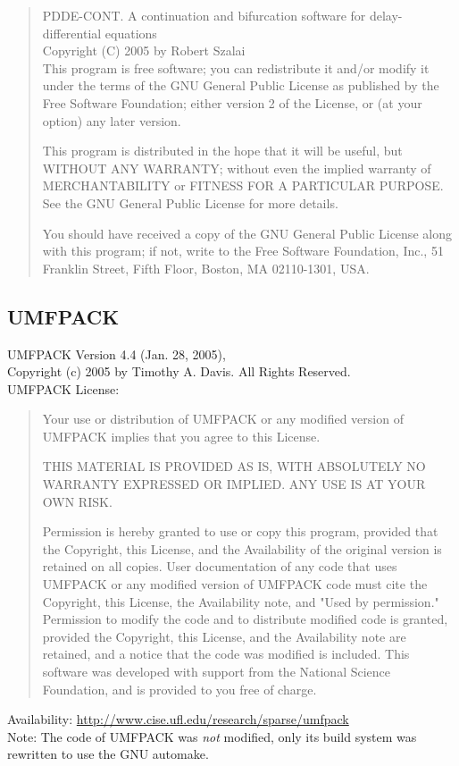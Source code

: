 \documentclass[10pt,a4paper]{ddedoc}
\begin{document}
\begin{quote}
PDDE-CONT. A continuation and bifurcation software for delay-differential equations \\
Copyright (C) 2005 by Robert Szalai \\

This program is free software; you can redistribute it and/or modify
it under the terms of the GNU General Public License as published by
the Free Software Foundation; either version 2 of the License, or
(at your option) any later version.

This program is distributed in the hope that it will be useful,
but WITHOUT ANY WARRANTY; without even the implied warranty of
MERCHANTABILITY or FITNESS FOR A PARTICULAR PURPOSE.  See the
GNU General Public License for more details.

You should have received a copy of the GNU General Public License
along with this program; if not, write to the Free Software
Foundation, Inc., 51 Franklin Street, Fifth Floor, Boston, MA  02110-1301, USA.
\end{quote}

\subsection{UMFPACK}

\noindent
UMFPACK Version 4.4 (Jan. 28, 2005), \\
Copyright (c) 2005 by Timothy A. Davis.  All Rights Reserved.\\[0.5em]
UMFPACK License:
\begin{quote}
    Your use or distribution of UMFPACK or any modified version of
    UMFPACK implies that you agree to this License.

    THIS MATERIAL IS PROVIDED AS IS, WITH ABSOLUTELY NO WARRANTY
    EXPRESSED OR IMPLIED.  ANY USE IS AT YOUR OWN RISK.

    Permission is hereby granted to use or copy this program, provided
    that the Copyright, this License, and the Availability of the original
    version is retained on all copies.  User documentation of any code that
    uses UMFPACK or any modified version of UMFPACK code must cite the
    Copyright, this License, the Availability note, and "Used by permission."
    Permission to modify the code and to distribute modified code is granted,
    provided the Copyright, this License, and the Availability note are
    retained, and a notice that the code was modified is included.  This
    software was developed with support from the National Science Foundation,
    and is provided to you free of charge.
\end{quote}
Availability: \url{http://www.cise.ufl.edu/research/sparse/umfpack} \\[0.5em]
Note: The code of UMFPACK was \emph{not} modified, only its build system was rewritten to use 
the GNU automake.
\end{document}
